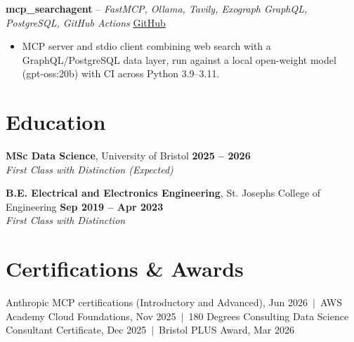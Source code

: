 \documentclass[a4paper,11pt]{article}
\begin{document}
\vspace{3pt}
\noindent\textbf{mcp\_searchagent} -- \textit{FastMCP, Ollama, Tavily, Exograph GraphQL, PostgreSQL, GitHub Actions} \hfill \href{https://github.com/Thiruvel-AP/mcp_searchagent}{GitHub}
\begin{itemize}
  \item MCP server and stdio client combining web search with a GraphQL/PostgreSQL data layer, run against a local open-weight model (gpt-oss:20b) with CI across Python 3.9–3.11.
\end{itemize}

\section{Education}
\textbf{MSc Data Science}, University of Bristol \hfill \textbf{2025 – 2026}\\ \textit{First Class with Distinction (Expected)}\par
\vspace{3pt}
\textbf{B.E. Electrical and Electronics Engineering}, St. Joseph\textquotesingle{}s College of Engineering \hfill \textbf{Sep 2019 – Apr 2023}\\ \textit{First Class with Distinction}\par

\section{Certifications \& Awards}
Anthropic MCP certifications (Introductory and Advanced), Jun 2026 \,$|$\, AWS Academy Cloud Foundations, Nov 2025 \,$|$\, 180 Degrees Consulting Data Science Consultant Certificate, Dec 2025 \,$|$\, Bristol PLUS Award, Mar 2026
\end{document}
